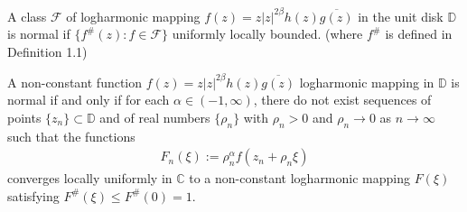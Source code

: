 \documentclass[10pt,a4paper]{amsart}
\begin{document}
\begin{thm}\label{th-2.1}
A class $\mathcal{F}$ of logharmonic mapping $f(z)=z|z|^{2\beta}h(z) \overline{g(z)}$ in the unit disk $\mathbb{D}$ is normal if $\{f^{\#}(z):f\in\mathcal{F}\}$ uniformly locally bounded. (where $f^{\#}$ is defined in Definition 1.1)
\end{thm}

\begin{thm}\label{th-2.2}
A non-constant function $f(z)=z|z|^{2\beta}h(z) \overline{g(z)}$ logharmonic mapping in $\mathbb{D}$ is normal if and only if for each $\alpha\in(-1,\infty)$, there do not exist sequences of points $\{z_n\}\subset\mathbb{D}$ and of real numbers $\{\rho_n\}$ with $\rho_n>0$ and $\rho_n\rightarrow 0$ as $n\rightarrow\infty$ such that the functions 
\begin{align*}
	F_n(\xi):=\rho^{\alpha}_n f(z_n+\rho_n\xi)
\end{align*}
converges locally uniformly in $\mathbb{C}$ to a non-constant logharmonic mapping $F(\xi)$ satisfying $F^{\#}(\xi)\leq F^{\#}(0)= 1$.
\end{thm}
\end{document}
